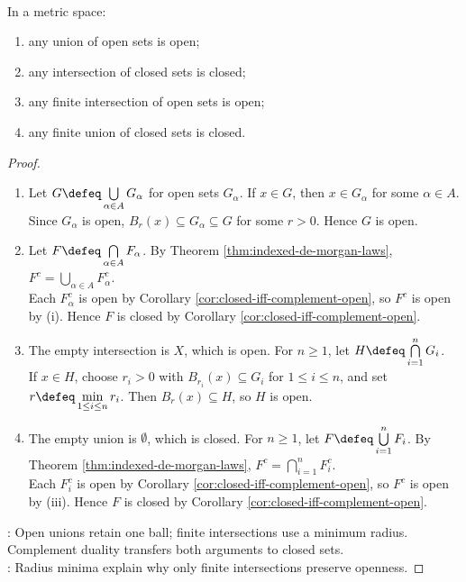 \begin{theorem} \label{thm:metric-open-closed-set-calculus} \\
In a metric space:
\begin{enumerate}[label=(\roman*)]
\setlength{\itemsep}{0pt}
\item any union of open sets is open;
\item any intersection of closed sets is closed;
\item any finite intersection of open sets is open;
\item any finite union of closed sets is closed.
\end{enumerate}
\begin{proof}
\begin{enumerate}[label=(\roman*)]
\setlength{\itemsep}{0pt}
\item Let $G\defeq\bigcup\limits_{\alpha\in A}G_\alpha$ for open sets $G_\alpha$. If $x\in G$, then $x\in G_\alpha$ for some $\alpha\in A$.\\
Since $G_\alpha$ is open, $B_r(x)\subseteq G_\alpha\subseteq G$ for some $r>0$. Hence $G$ is open.
\item Let $F\defeq\bigcap\limits_{\alpha\in A}F_\alpha$. By Theorem \ref{thm:indexed-de-morgan-laws}, $F^c=\bigcup\limits_{\alpha\in A}F_\alpha^c$.\\
Each $F_\alpha^c$ is open by Corollary \ref{cor:closed-iff-complement-open}, so $F^c$ is open by (i). Hence $F$ is closed by Corollary \ref{cor:closed-iff-complement-open}.
\item The empty intersection is $X$, which is open. For $n\geq1$, let $H\defeq\bigcap\limits_{i=1}^nG_i$.\\
If $x\in H$, choose $r_i>0$ with $B_{r_i}(x)\subseteq G_i$ for $1\leq i\leq n$, and set $r\defeq\min\limits_{1\leq i\leq n}r_i$. Then $B_r(x)\subseteq H$, so $H$ is open.
\item The empty union is $\emptyset$, which is closed. For $n\geq1$, let $F\defeq\bigcup\limits_{i=1}^nF_i$. By Theorem \ref{thm:indexed-de-morgan-laws}, $F^c=\bigcap\limits_{i=1}^nF_i^c$.\\
Each $F_i^c$ is open by Corollary \ref{cor:closed-iff-complement-open}, so $F^c$ is open by (iii). Hence $F$ is closed by Corollary \ref{cor:closed-iff-complement-open}.
\end{enumerate}
: Open unions retain one ball; finite intersections use a minimum radius.\\
Complement duality transfers both arguments to closed sets.\\
: Radius minima explain why only finite intersections preserve openness.
\end{proof}
\end{theorem}

